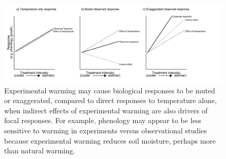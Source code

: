 \documentclass{article}
\begin{document}
 \begin{figure}[h]
 \centering
 \includegraphics{../figures/DirIndWarmingEffects.pdf}    
 \caption{Experimental warming may cause biological responses to be muted or exaggerated, compared to direct responses to temperature alone, when indirect effects of experimental warming are also drivers of focal responses. For example, phenology may appear to be less sensitive to warming in experiments versus observational studies \citep{wolkovich2012} because experimental warming reduces soil moisture, perhaps more than natural warming.} 
\end{figure}
\clearpage

\end{document}
